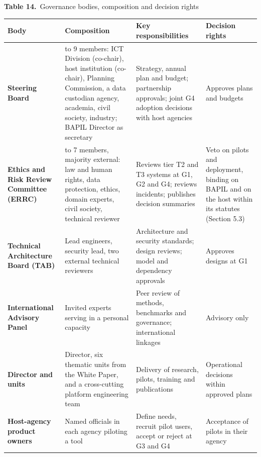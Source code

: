 \documentclass[border=10pt]{standalone}
\begin{document}
\begin{minipage}{17cm}
{\large\bfseries Table 14.}\ {\large Governance bodies, composition and decision rights}\par\vspace{7pt}
\small
{}
\begin{tabularx}{\linewidth}{@{}>{\hsize=0.782\hsize\raggedright\arraybackslash}X>{\hsize=1.195\hsize\raggedright\arraybackslash}X>{\hsize=1.287\hsize\raggedright\arraybackslash}X>{\hsize=0.736\hsize\raggedright\arraybackslash}X@{}}
\arrayrulecolor{bapilrule}\toprule
\rowcolor{white}\textbf{Body} & \textbf{Composition} & \textbf{Key responsibilities} & \textbf{Decision rights} \\
\midrule
\textbf{Steering Board} & 7 to 9 members: ICT Division (co-chair), host institution (co-chair), Planning Commission, a data custodian agency, academia, civil society, industry; BAPIL Director as secretary & Strategy, annual plan and budget; partnership approvals; joint G4 adoption decisions with host agencies & Approves plans and budgets \\
\textbf{Ethics and Risk Review Committee (ERRC)} & 5 to 7 members, majority external: law and human rights, data protection, ethics, domain experts, civil society, technical reviewer & Reviews tier T2 and T3 systems at G1, G2 and G4; reviews incidents; publishes decision summaries & Veto on pilots and deployment, binding on BAPIL and on the host within its statutes (Section 5.3) \\
\textbf{Technical Architecture Board (TAB)} & Lead engineers, security lead, two external technical reviewers & Architecture and security standards; design reviews; model and dependency approvals & Approves designs at G1 \\
\textbf{International Advisory Panel} & Invited experts serving in a personal capacity & Peer review of methods, benchmarks and governance; international linkages & Advisory only \\
\textbf{Director and units} & Director, six thematic units from the White Paper, and a cross-cutting platform engineering team & Delivery of research, pilots, training and publications & Operational decisions within approved plans \\
\textbf{Host-agency product owners} & Named officials in each agency piloting a tool & Define needs, recruit pilot users, accept or reject at G3 and G4 & Acceptance of pilots in their agency \\
\bottomrule
\end{tabularx}
\par{}
\end{minipage}
\end{document}
